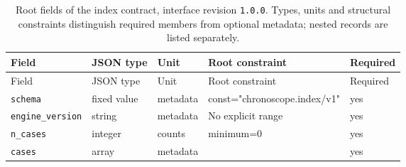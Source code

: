 \begingroup\small
\begin{longtable}{@{}p{}p{}p{}p{}p{}@{}}
\caption{Root fields of the index contract, interface revision \texttt{1.0.0}. Types, units and structural constraints distinguish required members from optional metadata; nested records are listed separately.}\label{tab:contract-index}\\
\toprule Field & JSON type & Unit & Root constraint & Required\\\midrule\endfirsthead
\toprule Field & JSON type & Unit & Root constraint & Required\\\midrule\endhead
\texttt{schema} & fixed value & metadata & const="chronosco\allowbreak{}pe.index/v1" & yes\\
\texttt{engine\_\allowbreak{}version} & string & metadata & No explicit range & yes\\
\texttt{n\_\allowbreak{}cases} & integer & counts & minimum=0 & yes\\
\texttt{cases} & array & metadata &  & yes\\
\bottomrule
\end{longtable}
\endgroup
